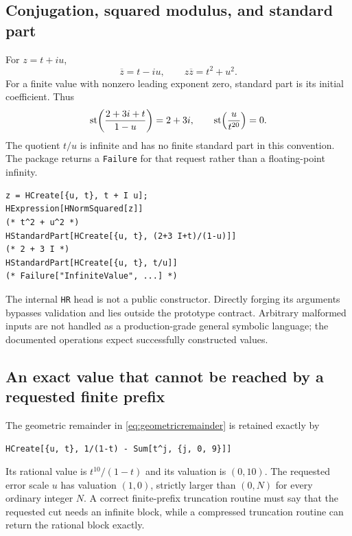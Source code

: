 \documentclass[11pt,letterpaper]{article}
\theoremstyle{definition}\newtheorem{definition}[theorem]{Definition}
\theoremstyle{remark}\newtheorem{remark}[theorem]{Remark}
\newcommand{\code}[1]{\texttt{#1}}
\numberwithin{equation}{section}\setcounter{tocdepth}{2}
\begin{document}
\subsection{Conjugation, squared modulus, and standard part}
For $z=t+iu$,
\[
 \overline z=t-iu,\qquad z\overline z=t^2+u^2.
\]
For a finite value with nonzero leading exponent zero, standard part is its initial coefficient. Thus
\[
 \operatorname{st}\!\left(\frac{2+3i+t}{1-u}\right)=2+3i,
 \qquad \operatorname{st}\!\left(\frac{u}{t^{20}}\right)=0.
\]
The quotient $t/u$ is infinite and has no finite standard part in this convention. The package returns a \code{Failure} for that request rather than a floating-point infinity.

\par\noindent\begin{minipage}{\textwidth}
\begin{lstlisting}
z = HCreate[{u, t}, t + I u];
HExpression[HNormSquared[z]]
(* t^2 + u^2 *)
HStandardPart[HCreate[{u, t}, (2+3 I+t)/(1-u)]]
(* 2 + 3 I *)
HStandardPart[HCreate[{u, t}, t/u]]
(* Failure["InfiniteValue", ...] *)
\end{lstlisting}
\end{minipage}\par
The internal \code{HR} head is not a public constructor. Directly forging its arguments bypasses validation and lies outside the prototype contract. Arbitrary malformed inputs are not handled as a production-grade general symbolic language; the documented operations expect successfully constructed values.

\subsection{An exact value that cannot be reached by a requested finite prefix}
The geometric remainder in \eqref{eq:geometricremainder} is retained exactly by
\par\noindent\begin{minipage}{\textwidth}
\begin{lstlisting}
HCreate[{u, t}, 1/(1-t) - Sum[t^j, {j, 0, 9}]]
\end{lstlisting}
\end{minipage}\par
Its rational value is $t^{10}/(1-t)$ and its valuation is $(0,10)$. The requested error scale $u$ has valuation $(1,0)$, strictly larger than $(0,N)$ for every ordinary integer $N$. A correct finite-prefix truncation routine must say that the requested cut needs an infinite block, while a compressed truncation routine can return the rational block exactly.
\end{document}
